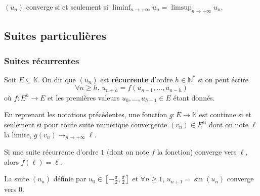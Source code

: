 	
	\begin{proposition}
		$(u_n)$ converge si et seulement si $\liminf_{n \rightarrow +\infty} u_n = \limsup_{n \rightarrow +\infty} u_n$.
	\end{proposition}
	
	\subsection{Suites particulières}
	
	\subsubsection{Suites récurrentes}
	
	
	\begin{definition}
		Soit $E \subseteq \mathbb{K}$. On dit que $(u_n)$ est \textbf{récurrente} d'ordre $h \in \mathbb{N}^*$ si on peut écrire
		\[ \forall n \geq h, \, u_{n+h} = f(u_{n-1}, \dots, u_{n-h}) \tag{$*$} \]
		où $f : E^h \rightarrow E$ et les premières valeurs $u_0, \dots, u_{h-1} \in E$ étant donnés.
	\end{definition}
	
	
	\begin{theorem}
		En reprenant les notations précédentes, une fonction $g : E \rightarrow \mathbb{K}$ est continue si et seulement si pour toute suite numérique convergente $(v_n) \in E^{\mathbb{N}}$ dont on note $\ell$ la limite, $g(v_n) \longrightarrow_{n \rightarrow +\infty} \ell$.
	\end{theorem}
	
	\begin{corollary}
		Si une suite récurrente d'ordre $1$ (dont on note $f$ la fonction) converge vers $\ell$, alors $f(\ell) = \ell$.
	\end{corollary}
	
	\begin{example}
		La suite $(u_n)$ définie par $u_0 \in \left[ -\frac{\pi}{2}, \frac{\pi}{2} \right]$ et $\forall n \geq 1, \, u_{n+1} = \sin(u_n)$ converge vers $0$.
	\end{example}
	
	
